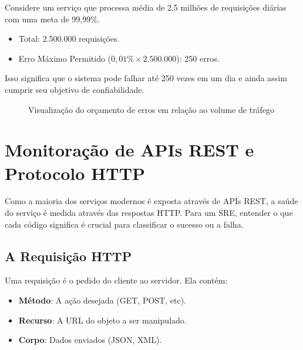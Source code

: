 \documentclass[12pt,a4paper]{report}
\begin{document}
Considere um serviço que processa média de 2,5 milhões de requisições diárias com uma meta de 99,99\%.

\begin{itemize}
    \item Total: 2.500.000 requisições.
    \item Erro Máximo Permitido ($0,01\% \times 2.500.000$): 250 erros.
\end{itemize}

Isso significa que o sistema pode falhar até 250 vezes em um dia e ainda assim cumprir seu objetivo de confiabilidade.

\begin{figure}[h]
    \centering
    \caption{Visualização do orçamento de erros em relação ao volume de tráfego}
\end{figure}

\section{Monitoração de APIs REST e Protocolo HTTP}

Como a maioria dos serviços modernos é exposta através de APIs REST, a saúde do serviço é medida através das respostas HTTP. Para um SRE, entender o que cada código significa é crucial para classificar o sucesso ou a falha.

\subsection{A Requisição HTTP}

Uma requisição é o pedido do cliente ao servidor. Ela contém:
\begin{itemize}
    \item \textbf{Método}: A ação desejada (GET, POST, etc).
    \item \textbf{Recurso}: A URL do objeto a ser manipulado.
    \item \textbf{Corpo}: Dados enviados (JSON, XML).
\end{itemize}
\end{document}
